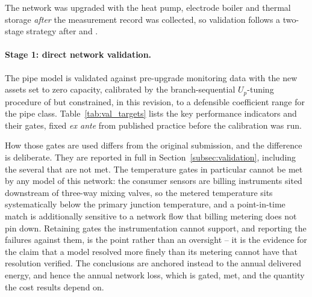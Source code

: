
The network was upgraded with the heat pump, electrode boiler and thermal storage
\emph{after} the measurement record was collected, so validation follows a two-stage
strategy after \citet{Kus2025} and \citet{Maldonado2024}.

\paragraph{Stage 1: direct network validation.}
The pipe model is validated against pre-upgrade monitoring data with the new assets set to
zero capacity, calibrated by the branch-sequential $U_p$-tuning procedure of
\citet{Maldonado2024} but constrained, in this revision, to a defensible coefficient range
for the pipe class. Table~\ref{tab:val_targets} lists the key performance indicators and
their gates, fixed \emph{ex ante} from published practice before the calibration was run.

How those gates are used differs from the original submission, and the difference is
deliberate. They are reported in full in Section~\ref{subsec:validation}, including the
several that are not met. The temperature gates in particular cannot be met by any model of
this network: the consumer sensors are billing instruments sited downstream of three-way
mixing valves, so the metered temperature sits systematically below the primary junction
temperature, and a point-in-time match is additionally sensitive to a network flow that
billing metering does not pin down. Retaining gates the instrumentation cannot support, and
reporting the failures against them, is the point rather than an oversight -- it is the
evidence for the claim that a model resolved more finely than its metering cannot have that
resolution verified. The conclusions are anchored instead to the annual delivered energy,
and hence the annual network loss, which is gated, met, and the quantity the cost results
depend on.

